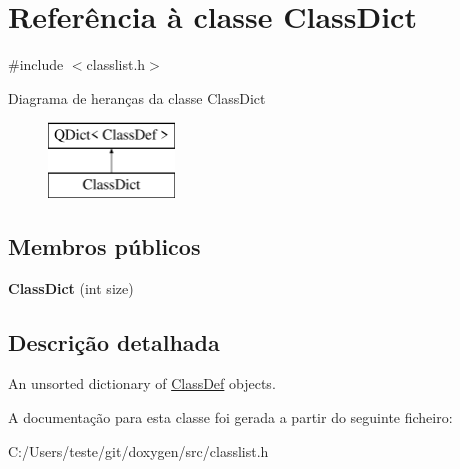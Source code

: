 \hypertarget{class_class_dict}{\section{Referência à classe Class\-Dict}
\label{class_class_dict}
}


{\ttfamily \#include $<$classlist.\-h$>$}

Diagrama de heranças da classe Class\-Dict\begin{figure}[H]
\begin{center}
\leavevmode
\includegraphics[height=2.000000cm]{class_class_dict}
\end{center}
\end{figure}
\subsection*{Membros públicos}
\begin{DoxyCompactItemize}
\item 
\hypertarget{class_class_dict_aed5aa24d6117e8e481356f8e8dfeb6e5}{{\bfseries Class\-Dict} (int size)}\label{class_class_dict_aed5aa24d6117e8e481356f8e8dfeb6e5}

\end{DoxyCompactItemize}


\subsection{Descrição detalhada}
An unsorted dictionary of \hyperlink{class_class_def}{Class\-Def} objects. 

A documentação para esta classe foi gerada a partir do seguinte ficheiro\-:\begin{DoxyCompactItemize}
\item 
C\-:/\-Users/teste/git/doxygen/src/classlist.\-h\end{DoxyCompactItemize}
